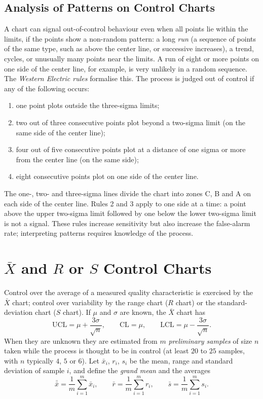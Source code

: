 \subsection{Analysis of Patterns on Control Charts}

A chart can signal out-of-control behaviour even when all points lie within the limits, if the points show a non-random pattern: a long \emph{run} (a sequence of points of the same type, such as above the center line, or successive increases), a trend, cycles, or unusually many points near the limits. A run of eight or more points on one side of the center line, for example, is very unlikely in a random sequence. The \emph{Western Electric rules} formalise this. The process is judged out of control if any of the following occurs:
\begin{enumerate}[label=\arabic*.]
  \item one point plots outside the three-sigma limits;
  \item two out of three consecutive points plot beyond a two-sigma limit (on the same side of the center line);
  \item four out of five consecutive points plot at a distance of one sigma or more from the center line (on the same side);
  \item eight consecutive points plot on one side of the center line.
\end{enumerate}
The one-, two- and three-sigma lines divide the chart into zones C, B and A on each side of the center line. Rules 2 and 3 apply to one side at a time: a point above the upper two-sigma limit followed by one below the lower two-sigma limit is not a signal. These rules increase sensitivity but also increase the false-alarm rate; interpreting patterns requires knowledge of the process.

\section{$\bar{X}$ and $R$ or $S$ Control Charts}

Control over the average of a measured quality characteristic is exercised by the $\bar{X}$ chart; control over variability by the range chart ($R$ chart) or the standard-deviation chart ($S$ chart). If $\mu$ and $\sigma$ are known, the $\bar{X}$ chart has
\[ \mathrm{UCL}=\mu+\frac{3\sigma}{\sqrt n},\qquad\mathrm{CL}=\mu,\qquad\mathrm{LCL}=\mu-\frac{3\sigma}{\sqrt n}. \]
When they are unknown they are estimated from $m$ \emph{preliminary samples} of size $n$ taken while the process is thought to be in control (at least $20$ to $25$ samples, with $n$ typically $4$, $5$ or $6$). Let $\bar{x}_i$, $r_i$, $s_i$ be the mean, range and standard deviation of sample $i$, and define the \emph{grand mean} and the averages
\[ \bar{\bar{x}}=\frac1m\sum_{i=1}^m\bar{x}_i,\qquad\bar{r}=\frac1m\sum_{i=1}^mr_i,\qquad\bar{s}=\frac1m\sum_{i=1}^ms_i. \]

